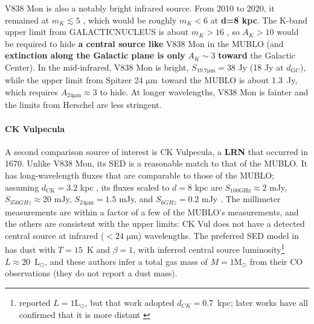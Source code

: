 \documentclass[]{aastex631}
\newcommand{\msun}{\ensuremath{\mathrm{M}_\odot}\xspace}
\newcommand{\lsun}{\ensuremath{\mathrm{L}_\odot}\xspace}
\newcommand{\um}{\ensuremath{\mathrm{\mu m}}\xspace}
\def\rr#1{\textbf{#1}}
\begin{document}
V838 Mon is also a notably bright infrared source.
From 2010 to 2020, it remained at $m_K \lesssim 5$ \citep{Woodward2021}, which would be roughly $m_K<6$ at \rr{d=8 kpc}.  
The K-band upper limit from GALACTICNUCLEUS is about $m_K > 16$ \citep[the 80\% completeness limit;][]{Nogueras-Lara2020}, so $A_K>10$ would be required to hide \rr{a central source like} V838 Mon in the MUBLO (and \rr{extinction along the Galactic plane is only} $A_K\sim3$ \rr{toward} the Galactic Center).
In the mid-infrared, V838 Mon is bright, $S_{19.7 \um}=38$ Jy (18 Jy at $d_{\mathrm{GC}}$), while the upper limit from Spitzer 24 \um~toward the MUBLO is about 1.3~Jy, which requires $A_{24 \um}\approx3$ to hide.
At longer wavelengths, V838 Mon is fainter and the limits from Herschel are less stringent.


\paragraph{CK Vulpecula}
A second comparison source of interest is CK Vulpecula, a \rr{LRN} that occurred in 1670.
Unlike V838 Mon, its SED is a reasonable match to that of the MUBLO.
It has long-wavelength fluxes that are comparable to those of the MUBLO; assuming $d_{\mathrm{CK}}=3.2$ kpc \citep{Banerjee2020,Kaminski2021_CKII}, its fluxes scaled to $d=8$ kpc are $S_{\mathrm{100 GHz}}\approx2$ mJy, $S_{350 GHz}\approx20$ mJy, $S_{24 \um}=1.5$ mJy, and $S_{6 GHz}=0.2$ mJy \citep{Kaminski2015}.
The millimeter measurements are within a factor of a few of the MUBLO's measurements, and the others are consistent with the upper limits: CK Vul does not have a detected central source at infrared ($<24$ \um) wavelengths.
The preferred SED model in \citet{Kaminski2015} has dust with $T=15$~K and $\beta=1$, with inferred central source luminosity\footnote{\citet{Kaminski2015} reported $L=1\lsun$, but that work adopted $d_{CK}=0.7$~kpc; later works have all confirmed that it is more distant \citep{Banerjee2020,Kaminski2021_CKII}} $L\approx20$~\lsun, and these authors infer a total gas mass of $M=1 \msun$  from their CO observations (they do not report a dust mass).
\end{document}
